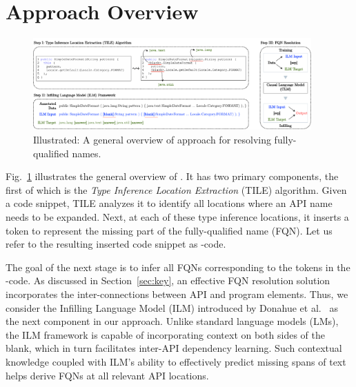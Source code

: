\section{Approach Overview}
\label{sec:overview}

\begin{figure}[ht]
 \centering
 \includegraphics[width=0.95\textwidth]{overview-ilm.pdf}
 \caption{Illustrated: A general overview of \tool approach for resolving fully-qualified names.}
 \label{fig:approach}
\end{figure}

Fig.~\ref{fig:approach} illustrates the general overview of {\tool}. It has two primary components, the first of which is the {\em Type Inference Location Extraction} (TILE) algorithm. Given a code snippet, TILE analyzes it to identify all locations where an API name needs to be expanded. Next, at each of these type inference locations, it inserts a  token to represent the missing part of the fully-qualified name (FQN). Let us refer to the resulting  inserted code snippet as -code.

The goal of the next stage is to infer all FQNs corresponding to the  tokens in the -code. As discussed in Section~\ref{sec:key}, an effective FQN resolution solution incorporates the inter-connections between API and program elements. Thus, we consider the Infilling Language Model (ILM) introduced by Donahue et al.~\cite{} as the next component in our approach. Unlike standard language models (LMs), the ILM framework is capable of incorporating context on both sides of the blank, which in turn facilitates inter-API dependency learning. Such contextual knowledge coupled with ILM's ability to effectively predict missing spans of text helps \tool derive FQNs at all relevant API locations.


